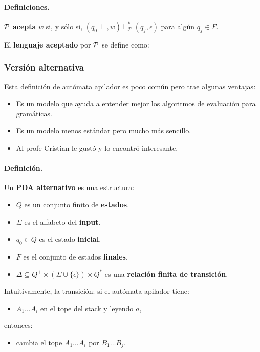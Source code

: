 \paragraph*{Definiciones.} $\cal{P}$ \textbf{acepta} $w$ si, y sólo si, $\left(q_0 \perp, w\right) \vdash_{\mathcal{P}}^*\left(q_f, \epsilon\right)$ para algún $q_f \in F$.

\hspace{70pt} El \textbf{lenguaje aceptado} por $\mathcal{P}$ se define como:

\subsubsection{Versión alternativa}
Esta definición de autómata apilador es poco común pero trae algunas ventajas:
\begin{itemize}
    \item Es un modelo que ayuda a entender mejor los algoritmos de evaluación para gramáticas.
    \item Es un modelo menos estándar pero mucho más sencillo.
    \item Al profe Cristian le gustó y lo encontró interesante.
\end{itemize}

\paragraph*{Definición.} Un \textbf{PDA alternativo} es una estructura:
\begin{itemize}
    \item $Q$ es un conjunto finito de \textbf{estados}.
    \item $\Sigma$ es el alfabeto del \textbf{input}.
    \item $q_0 \in Q$ es el estado \textbf{inicial}.
    \item $F$ es el conjunto de estados \textbf{finales}.
    \item $\Delta \subseteq Q^+ \times (\Sigma \cup \{\epsilon\})\times Q^*$ es una \textbf{relación finita de transición}.
\end{itemize}
Intuitivamente, la transición:
si el autómata apilador tiene:
\begin{itemize}
    \item $A_1\ldots A_i$ en el tope del stack y leyendo $a$,
\end{itemize}
entonces:
\begin{itemize}
    \item cambia el tope $A_1\ldots A_i$ por $B_1\ldots B_j$.
\end{itemize}

